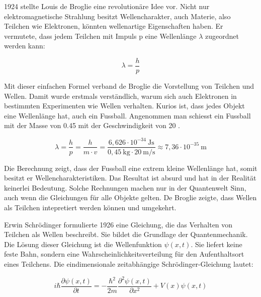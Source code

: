 	
	1924 stellte Louis de Broglie eine revolutionäre Idee vor.
	Nicht nur elektromagnetische Strahlung besitzt Wellencharakter, auch Materie, also Teilchen wie Elektronen, könnten wellenartige Eigenschaften haben.
	Er vermutete, dass jedem Teilchen mit Impuls p eine Wellenlänge $\lambda$ zugeordnet werden kann:
	
	\begin{equation}
		\lambda = \frac{h}{p}
	\end{equation}	
	
	Mit dieser einfachen Formel verband de Broglie die Vorstellung von Teilchen und Wellen. Damit wurde erstmals verständlich, warum sich auch Elektronen in bestimmten Experimenten wie Wellen verhalten.
	Kurios ist, dass jedes Objekt eine Wellenlänge hat, auch ein Fussball.
	Angenommen man schiesst ein Fussball mit der Masse von 0.45  mit der Geschwindigkeit von 20 .
	
	\begin{equation}
		\lambda = \frac{h}{p} = \frac{h}{m \cdot v} = 	\frac{6{,}626 \cdot 10^{-34} \ \text{Js}}{0{,}45 \ \text{kg} \cdot 20 \ \text{m/s}} \approx 7{,}36 \cdot 10^{-35} \ \text{m}
	\end{equation}	
	
	Die Berechnung zeigt, dass der Fussball eine extrem kleine Wellenlänge hat, somit besitzt er Wellencharakteristiken.
	Das Resultat ist absurd und hat in der Realität keinerlei Bedeutung.
	Solche Rechnungen machen nur in der Quantenwelt Sinn, auch wenn die Gleichungen für alle Objekte gelten. 
	De Broglie zeigte, dass Wellen als Teilchen intepretiert werden können und umgekehrt. 
	
	
	
	Erwin Schrödinger formulierte 1926 eine Gleichung, die das Verhalten von Teilchen als Wellen beschreibt. 
	Sie bildet die Grundlage der Quantenmechanik. Die Lösung dieser Gleichung ist die Wellenfunktion \( \psi(x, t) \). Sie liefert keine feste Bahn, sondern eine Wahrscheinlichkeitsverteilung für den Aufenthaltsort eines Teilchens.
	Die eindimensionale zeitabhängige Schrödinger-Gleichung lautet:
	
	\begin{equation}\label{fourier:equation:zeitabhaengigeSchroedingerGleichung}
		i \hbar \frac{\partial \psi(x,t)}{\partial t} = -\frac{\hbar^2}{2m} \frac{\partial^2 \psi(x,t)}{\partial x^2} + V(x) \psi(x,t)
	\end{equation}
	
